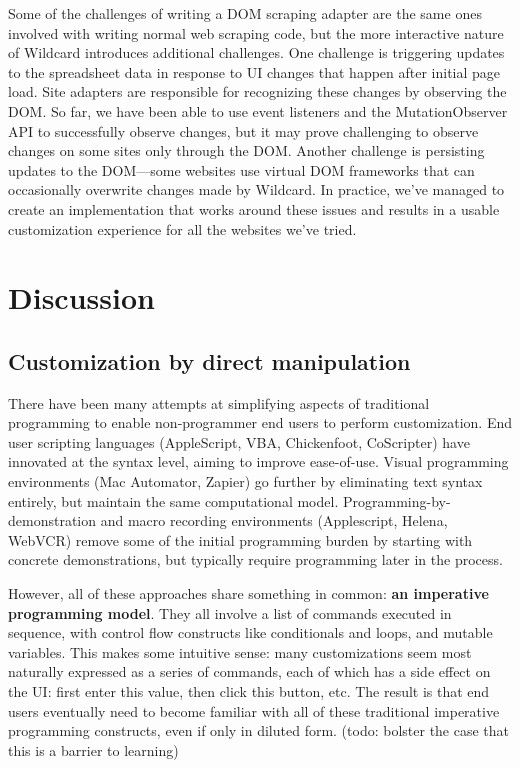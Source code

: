 \documentclass[sigplan,10pt,anonymous,review]{acmart}
\begin{document}
Some of the challenges of writing a DOM scraping adapter are the same
ones involved with writing normal web scraping code, but the more
interactive nature of Wildcard introduces additional challenges. One
challenge is triggering updates to the spreadsheet data in response to
UI changes that happen after initial page load. Site adapters are
responsible for recognizing these changes by observing the DOM. So far,
we have been able to use event listeners and the MutationObserver API to
successfully observe changes, but it may prove challenging to observe
changes on some sites only through the DOM. Another challenge is
persisting updates to the DOM---some websites use virtual DOM frameworks
that can occasionally overwrite changes made by Wildcard. In practice,
we've managed to create an implementation that works around these issues
and results in a usable customization experience for all the websites
we've tried.

\hypertarget{sec:discussion}{%
\section{Discussion}\label{sec:discussion}}

\hypertarget{customization-by-direct-manipulation}{%
\subsection{Customization by direct
manipulation}\label{customization-by-direct-manipulation}}

There have been many attempts at simplifying aspects of traditional
programming to enable non-programmer end users to perform customization.
End user scripting languages (AppleScript, VBA, Chickenfoot, CoScripter)
have innovated at the syntax level, aiming to improve ease-of-use.
Visual programming environments (Mac Automator, Zapier) go further by
eliminating text syntax entirely, but maintain the same computational
model. Programming-by-demonstration and macro recording environments
(Applescript, Helena, WebVCR) remove some of the initial programming
burden by starting with concrete demonstrations, but typically require
programming later in the process.

However, all of these approaches share something in common: \textbf{an
imperative programming model}. They all involve a list of commands
executed in sequence, with control flow constructs like conditionals and
loops, and mutable variables. This makes some intuitive sense: many
customizations seem most naturally expressed as a series of commands,
each of which has a side effect on the UI: first enter this value, then
click this button, etc. The result is that end users eventually need to
become familiar with all of these traditional imperative programming
constructs, even if only in diluted form. (todo: bolster the case that
this is a barrier to learning)
\end{document}
